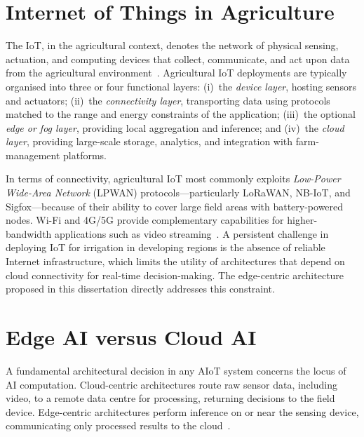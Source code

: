 \documentclass[12pt,a4paper]{report}
\newcommand{\abbr}[2]{\emph{#1} (#2)}
\begin{document}
\section{Internet of Things in Agriculture}

The IoT, in the agricultural context, denotes the network of physical sensing, actuation, and computing devices that collect, communicate, and act upon data from the agricultural environment~\cite{Atzori2010,Tzounis2017}. Agricultural IoT deployments are typically organised into three or four functional layers: (i)~the \emph{device layer}, hosting sensors and actuators; (ii)~the \emph{connectivity layer}, transporting data using protocols matched to the range and energy constraints of the application; (iii)~the optional \emph{edge or fog layer}, providing local aggregation and inference; and (iv)~the \emph{cloud layer}, providing large-scale storage, analytics, and integration with farm-management platforms.

In terms of connectivity, agricultural IoT most commonly exploits \abbr{Low-Power Wide-Area Network}{LPWAN} protocols---particularly LoRaWAN, NB-IoT, and Sigfox---because of their ability to cover large field areas with battery-powered nodes. Wi-Fi and 4G/5G provide complementary capabilities for higher-bandwidth applications such as video streaming~\cite{Muhammed2024}. A persistent challenge in deploying IoT for irrigation in developing regions is the absence of reliable Internet infrastructure, which limits the utility of architectures that depend on cloud connectivity for real-time decision-making. The edge-centric architecture proposed in this dissertation directly addresses this constraint.

\section{Edge AI versus Cloud AI}

A fundamental architectural decision in any AIoT system concerns the locus of AI computation. Cloud-centric architectures route raw sensor data, including video, to a remote data centre for processing, returning decisions to the field device. Edge-centric architectures perform inference on or near the sensing device, communicating only processed results to the cloud~\cite{Shi2016,Ahvar2023}.
\end{document}
